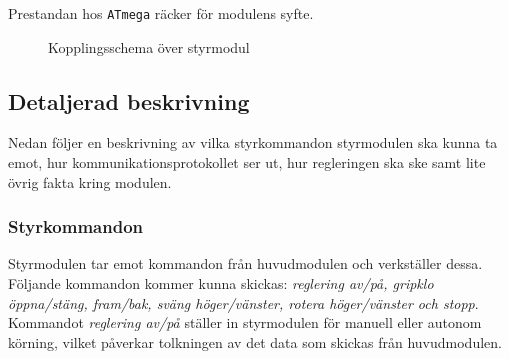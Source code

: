 \documentclass[11pt]{article}
\begin{document}
\begin{flushleft}
Prestandan hos \verb+ATmega+ räcker för modulens syfte. 

\begin{figure}[htbp]
\centering
\noindent{}
	\caption{Kopplingsschema över styrmodul \label{kopplingsschema:styrmodul}}	
\end{figure}
 
\subsection{Detaljerad beskrivning}
Nedan följer en beskrivning av vilka styrkommandon styrmodulen ska kunna ta emot, hur kommunikationsprotokollet ser ut, hur regleringen ska ske samt lite övrig fakta kring modulen.

\subsubsection{Styrkommandon}\label{Styrkommandon}
Styrmodulen tar emot kommandon från huvudmodulen och verkställer dessa. Följande kommandon kommer kunna skickas: \textit{reglering av/på, gripklo öppna/stäng, fram/bak, sväng höger/vänster, rotera höger/vänster och stopp}. Kommandot \textit{reglering av/på} ställer in styrmodulen för manuell eller autonom körning, vilket påverkar tolkningen av det data som skickas från huvudmodulen.


\end{flushleft}
\end{document}
